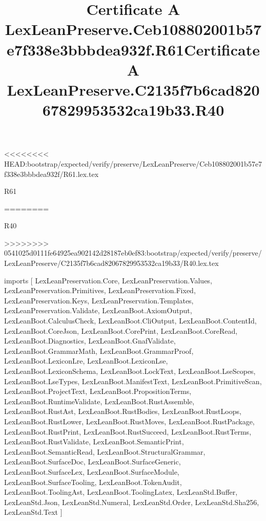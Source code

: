 <<<<<<<< HEAD:bootstrap/expected/verify/preserve/LexLeanPreserve/Ceb108802001b57e7f338e3bbbdea932f/R61.lex.tex
\begin{lexlean}{R61}
\title{Certificate A LexLeanPreserve.Ceb108802001b57e7f338e3bbbdea932f.R61}
========
\begin{lexlean}{R40}
\title{Certificate A LexLeanPreserve.C2135f7b6cad82067829953532ca19b33.R40}
>>>>>>>> 0541025d0111fe64925ea902142d28187eb0ef83:bootstrap/expected/verify/preserve/LexLeanPreserve/C2135f7b6cad82067829953532ca19b33/R40.lex.tex
\begin{coremodule}
imports [
  LexLeanPreservation.Core,
  LexLeanPreservation.Values,
  LexLeanPreservation.Primitives,
  LexLeanPreservation.Fixed,
  LexLeanPreservation.Keys,
  LexLeanPreservation.Templates,
  LexLeanPreservation.Validate,
  LexLeanBoot.AxiomOutput,
  LexLeanBoot.CalculusCheck,
  LexLeanBoot.CliOutput,
  LexLeanBoot.ContentId,
  LexLeanBoot.CoreJson,
  LexLeanBoot.CorePrint,
  LexLeanBoot.CoreRead,
  LexLeanBoot.Diagnostics,
  LexLeanBoot.GnafValidate,
  LexLeanBoot.GrammarMath,
  LexLeanBoot.GrammarProof,
  LexLeanBoot.LexiconLre,
  LexLeanBoot.LexiconLse,
  LexLeanBoot.LexiconSchema,
  LexLeanBoot.LockText,
  LexLeanBoot.LseScopes,
  LexLeanBoot.LseTypes,
  LexLeanBoot.ManifestText,
  LexLeanBoot.PrimitiveScan,
  LexLeanBoot.ProjectText,
  LexLeanBoot.PropositionTerms,
  LexLeanBoot.RuntimeValidate,
  LexLeanBoot.RustAssemble,
  LexLeanBoot.RustAst,
  LexLeanBoot.RustBodies,
  LexLeanBoot.RustLoops,
  LexLeanBoot.RustLower,
  LexLeanBoot.RustMoves,
  LexLeanBoot.RustPackage,
  LexLeanBoot.RustPrint,
  LexLeanBoot.RustSucceed,
  LexLeanBoot.RustTerms,
  LexLeanBoot.RustValidate,
  LexLeanBoot.SemanticPrint,
  LexLeanBoot.SemanticRead,
  LexLeanBoot.StructuralGrammar,
  LexLeanBoot.SurfaceDoc,
  LexLeanBoot.SurfaceGeneric,
  LexLeanBoot.SurfaceLex,
  LexLeanBoot.SurfaceModule,
  LexLeanBoot.SurfaceTooling,
  LexLeanBoot.TokenAudit,
  LexLeanBoot.ToolingAst,
  LexLeanBoot.ToolingLatex,
  LexLeanStd.Buffer,
  LexLeanStd.Json,
  LexLeanStd.Numeral,
  LexLeanStd.Order,
  LexLeanStd.Sha256,
  LexLeanStd.Text
]


\end{coremodule}
\end{lexlean}
\end{lexlean}
